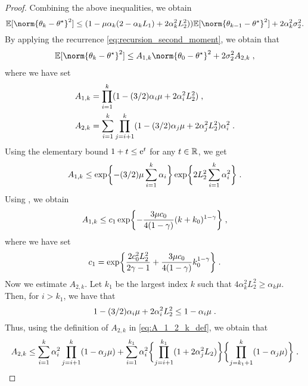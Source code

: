 \begin{proof}
  Combining the above inequalities, we obtain 
   \begin{equation}
   \label{eq:recursion_second_moment}
       \PE [\norm{\theta_k-\thetas}^2]\leq (1-\mu \alpha_k (2 - \alpha_k L_1) +2 \alpha_k^2 L_2^2))\PE[\norm{\theta_{k-1}-\thetas}^2]+2\alpha_k^2\sigma_2^2.
    \end{equation}
    By applying the recurrence \eqref{eq:recursion_second_moment}, we obtain that 
    \begin{align}
         \PE[\norm{\theta_k-\thetas}^2] 
         \leq A_{1,k} \norm{\theta_0-\thetas}^2 + 2 \sigma_2^2 A_{2,k}\eqsp, 
    \end{align}
where we have set 
\begin{equation}
\label{eq:A_1_2_k_def}
\begin{split}
A_{1,k} &= \prod_{i=1}^k(1- (3/2)\alpha_i\mu+2 \alpha_i^2 L_2^2)\;, \\
A_{2,k} &= \sum_{i=1}^k\prod_{j=i+1}^k(1-(3/2) \alpha_j\mu+2\alpha_j^2 L_2^2)\alpha_i^2\;.
\end{split}
\end{equation}
Using the elementary bound $1+t \leq \mathrm{e}^{t}$ for any $t\in \mathbb{R}$, we get 
\begin{equation}
    A_{1,k} \leq \exp\biggl\{-(3/2) \mu\sum_{i=1}^k\alpha_i \biggr\}\exp\biggl\{2L_2^2\sum_{i=1}^k\alpha_i^2\biggr\}\;.
\end{equation}
Using , we obtain 
\begin{equation}
\label{eq:A_1_k_bound}
A_{1,k} \leq c_{1} \exp\biggl\{-\frac{3\mu c_0}{4(1-\gamma)} (k+k_0)^{1-\gamma}\biggr\}\;,
\end{equation}
where we have set 
\begin{equation}
\label{eq:c_1_small}
c_1 = \exp\biggl\{\frac{2c_0^2L_2^2}{2\gamma-1} + \frac{3\mu c_0}{4(1-\gamma)}k_0^{1-\gamma}\biggr\}\;.
\end{equation}
Now we estimate $A_{2,k}$. Let $k_1$ be the largest index $k$ such that $4 \alpha_k^2 L_2^2 \geq \alpha_k\mu$. Then, for $i > k_1$, we have that 
\[
1- (3/2) \alpha_i \mu+2 \alpha_i^2 L_2^2 \leq 1 - \alpha_i \mu \;.
\]
Thus, using the definition of $A_{2,k}$ in \eqref{eq:A_1_2_k_def}, we obtain that 
\begin{align}
    A_{2,k}  \leq \sum_{i=1}^k \alpha_i^2 \prod_{j=i+1}^k(1-\alpha_j\mu) +  \sum_{i=1}^{k_1}\alpha_i^2 \biggl\{ \prod_{j=i+1}^{k_1}(1+2\alpha_j^2 L_2) \biggr\} \biggl\{ \prod_{j=k_1+1}^{k}(1-\alpha_j\mu) \biggr\}\;.
\end{align}

\end{proof}
